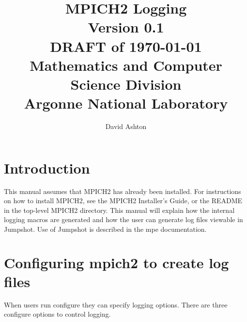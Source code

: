 \documentclass[dvipdfm,11pt]{article}
\begin{document}
\title{MPICH2 Logging\\
Version 0.1\\
DRAFT of \today\\
Mathematics and Computer Science Division\\
Argonne National Laboratory}

\author{David Ashton}


\maketitle

\cleardoublepage

\pagestyle{headings}


\section{Introduction}
\label{sec:introduction}

This manual assumes that MPICH2 has already been installed.  For
instructions on how to install MPICH2, see the MPICH2 Installer's Guide,
or the README in the top-level MPICH2 directory.  This manual will
explain how the internal logging macros are generated and how the user
can generate log files viewable in Jumpshot.  Use of Jumpshot is 
described in the mpe documentation.


\section{Configuring mpich2 to create log files}
\label{sec:configuring}

When users run configure they can specify logging options.  There are three 
configure options to control logging.
\end{document}
